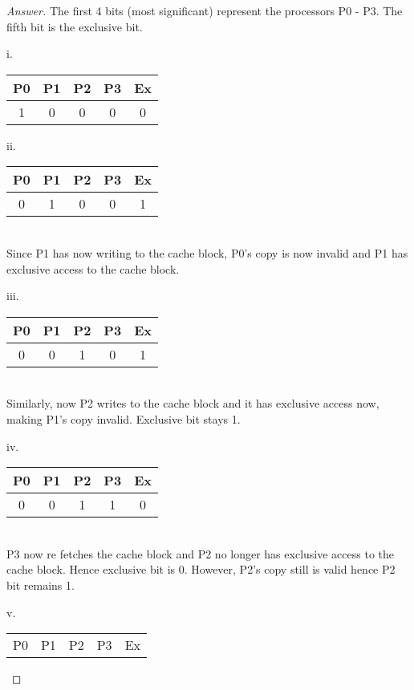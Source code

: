 \documentclass[12pt]{article}
\begin{document}
\begin{proof}[Answer]
The first 4 bits (most significant) represent the processors P0 - P3. The fifth bit is the exclusive bit.
	 \begin{center}
		i.
		\begin{tabular}{|| c c c c c||}
		\hline
		P0 & P1 & P2 & P3 & Ex \\ [0.5ex]
		\hline \hline
		1 & 0 & 0 & 0 & 0 \\ \hline
		\end{tabular}
	\end{center}
	\begin{center}
		ii.
		\begin{tabular}{|| c c c c c||}
		\hline
		P0 & P1 & P2 & P3 & Ex \\ [0.5ex]
		\hline \hline
		0 & 1 & 0 & 0 & 1 \\ \hline
		\end{tabular}
	\\ Since P1 has now writing to the cache block, P0's copy is now invalid and P1 has exclusive access to the cache block.
	\end{center}
	\begin{center}
		iii.
		\begin{tabular}{|| c c c c c||}
		\hline
		P0 & P1 & P2 & P3 & Ex \\ [0.5ex]
		\hline \hline
		0 & 0 & 1 & 0 & 1 \\ \hline
		\end{tabular}
	\\ Similarly, now P2 writes to the cache block and it has exclusive access now, making P1's copy invalid. Exclusive bit stays 1.
	\end{center}
	\begin{center}
		iv.
		\begin{tabular}{|| c c c c c||}
		\hline
		P0 & P1 & P2 & P3 & Ex \\ [0.5ex]
		\hline \hline
		0 & 0 & 1 & 1 & 0 \\ \hline
		\end{tabular}
	\\ P3 now re fetches the cache block and P2 no longer has exclusive access to the cache block. Hence exclusive bit is 0. However, P2's copy still is valid hence P2 bit remains 1.
	\end{center}
	\begin{center}
		v.
		\begin{tabular}{|| c c c c c||}
		\hline
		P0 & P1 & P2 & P3 & Ex \\ [0.5ex]

\end{tabular}
\end{center}
\end{proof}
\end{document}
